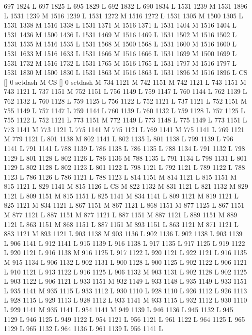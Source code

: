 {{{{{{{{{{{{{{{{{{{{{{{{697 1824 L
697 1825 L
695 1829 L
692 1832 L
690 1834 L
1531 1239 M 1531 1896 L
1531 1239 M 1516 1239 L
1531 1272 M 1516 1272 L
1531 1305 M 1500 1305 L
1531 1338 M 1516 1338 L
1531 1371 M 1516 1371 L
1531 1404 M 1516 1404 L
1531 1436 M 1500 1436 L
1531 1469 M 1516 1469 L
1531 1502 M 1516 1502 L
1531 1535 M 1516 1535 L
1531 1568 M 1500 1568 L
1531 1600 M 1516 1600 L
1531 1633 M 1516 1633 L
1531 1666 M 1516 1666 L
1531 1699 M 1500 1699 L
1531 1732 M 1516 1732 L
1531 1765 M 1516 1765 L
1531 1797 M 1516 1797 L
1531 1830 M 1500 1830 L
1531 1863 M 1516 1863 L
1531 1896 M 1516 1896 L
CS [] 0 setdash M
CS [] 0 setdash M
734 1121 M 742 1151 M 742 1121 L
743 1151 M 743 1121 L
737 1151 M 752 1151 L
756 1149 L
759 1147 L
760 1144 L
762 1139 L
762 1132 L
760 1128 L
759 1125 L
756 1122 L
752 1121 L
737 1121 L
752 1151 M 755 1149 L
757 1147 L
759 1144 L
760 1139 L
760 1132 L
759 1128 L
757 1125 L
755 1122 L
752 1121 L
773 1151 M 772 1149 L
773 1148 L
775 1149 L
773 1151 L
773 1141 M 773 1121 L
775 1141 M 775 1121 L
769 1141 M 775 1141 L
769 1121 M 779 1121 L
801 1138 M 802 1141 L
802 1135 L
801 1138 L
799 1139 L
796 1141 L
791 1141 L
788 1139 L
786 1138 L
786 1135 L
788 1134 L
791 1132 L
798 1129 L
801 1128 L
802 1126 L
786 1136 M 788 1135 L
791 1134 L
798 1131 L
801 1129 L
802 1128 L
802 1123 L
801 1122 L
798 1121 L
792 1121 L
789 1122 L
788 1123 L
786 1126 L
786 1121 L
788 1123 L
814 1151 M 814 1121 L
815 1151 M 815 1121 L
829 1141 M 815 1126 L
CS M
822 1132 M 831 1121 L
821 1132 M 829 1121 L
809 1151 M 815 1151 L
825 1141 M 834 1141 L
809 1121 M 819 1121 L
825 1121 M 834 1121 L
867 1151 M 867 1121 L
868 1151 M 877 1125 L
867 1151 M 877 1121 L
887 1151 M 877 1121 L
887 1151 M 887 1121 L
889 1151 M 889 1121 L
863 1151 M 868 1151 L
887 1151 M 893 1151 L
863 1121 M 871 1121 L
883 1121 M 893 1121 L
903 1138 M 903 1136 L
902 1136 L
902 1138 L
903 1139 L
906 1141 L
912 1141 L
915 1139 L
916 1138 L
917 1135 L
917 1125 L
919 1122 L
920 1121 L
916 1138 M 916 1125 L
917 1122 L
920 1121 L
922 1121 L
916 1135 M 915 1134 L
906 1132 L
902 1131 L
900 1128 L
900 1125 L
902 1122 L
906 1121 L
910 1121 L
913 1122 L
916 1125 L
906 1132 M 903 1131 L
902 1128 L
902 1125 L
903 1122 L
906 1121 L
933 1151 M 932 1149 L
933 1148 L
935 1149 L
933 1151 L
935 1141 M 935 1115 L
933 1112 L
930 1110 L
928 1110 L
926 1112 L
926 1113 L
928 1115 L
929 1113 L
928 1112 L
933 1141 M 933 1115 L
932 1112 L
930 1110 L
929 1141 M 935 1141 L
954 1141 M 949 1139 L
946 1136 L
945 1132 L
945 1129 L
946 1125 L
949 1122 L
954 1121 L
956 1121 L
961 1122 L
964 1125 L
965 1129 L
965 1132 L
964 1136 L
961 1139 L
956 1141 L
}}}}}}}}}}}}}}}}}}}}}}}}
